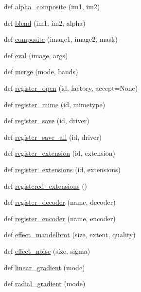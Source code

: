 \begin{DoxyCompactItemize}
\item 
def \hyperlink{namespacePIL_1_1Image_aa30033bf03231aa454219a169521b5ca}{alpha\+\_\+composite} (im1, im2)
\item 
def \hyperlink{namespacePIL_1_1Image_a2aaf219b9db8c7c104f2447fc7b53556}{blend} (im1, im2, alpha)
\item 
def \hyperlink{namespacePIL_1_1Image_a98814f9f03151be0baf6094694f62649}{composite} (image1, image2, mask)
\item 
def \hyperlink{namespacePIL_1_1Image_aec9f29cac3b547a7f4e4fd12c026668a}{eval} (image, args)
\item 
def \hyperlink{namespacePIL_1_1Image_abc09f314a053ff8f709b5ed2aba502e3}{merge} (mode, bands)
\item 
def \hyperlink{namespacePIL_1_1Image_ae5cb271c5ca44d8fabecf6826ca32c1d}{register\+\_\+open} (id, factory, accept=None)
\item 
def \hyperlink{namespacePIL_1_1Image_aecc3873ff9815428fc61904b5c50ff18}{register\+\_\+mime} (id, mimetype)
\item 
def \hyperlink{namespacePIL_1_1Image_aed6ee26fb447b555278105ae5aac0969}{register\+\_\+save} (id, driver)
\item 
def \hyperlink{namespacePIL_1_1Image_af606d8e47c135fb44fba756579c00997}{register\+\_\+save\+\_\+all} (id, driver)
\item 
def \hyperlink{namespacePIL_1_1Image_ae528317f817b321c71f8844e3489073e}{register\+\_\+extension} (id, extension)
\item 
def \hyperlink{namespacePIL_1_1Image_aef09e6bf33d8abe644fa20fe1b473d55}{register\+\_\+extensions} (id, extensions)
\item 
def \hyperlink{namespacePIL_1_1Image_a3b6ec14aecc634f1071a1f464ce4da6a}{registered\+\_\+extensions} ()
\item 
def \hyperlink{namespacePIL_1_1Image_aa3e31daf60b9a8e36021cfc6fd7712e8}{register\+\_\+decoder} (name, decoder)
\item 
def \hyperlink{namespacePIL_1_1Image_a644b41f5ea9e6a89d408e2f85937a012}{register\+\_\+encoder} (name, encoder)
\item 
def \hyperlink{namespacePIL_1_1Image_a0af0bdfd95c3adf70d21749bae884e91}{effect\+\_\+mandelbrot} (size, extent, quality)
\item 
def \hyperlink{namespacePIL_1_1Image_a55100d92e0e9a190ab73f69249d74de1}{effect\+\_\+noise} (size, sigma)
\item 
def \hyperlink{namespacePIL_1_1Image_ab5a8e6453cedbab3bf5f20ef1bd061fc}{linear\+\_\+gradient} (mode)
\item 
def \hyperlink{namespacePIL_1_1Image_a963c2d03d760efd61f63c046093e3782}{radial\+\_\+gradient} (mode)
\end{DoxyCompactItemize}
